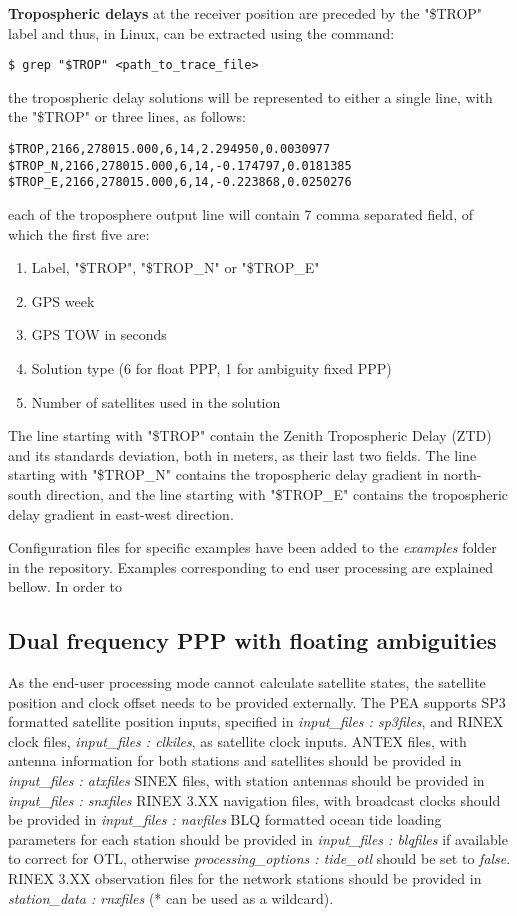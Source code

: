 \textbf{Tropospheric delays} at the receiver position are preceded by the "\$TROP" label and thus, in Linux, can be extracted using the command:
 \begin{verbatim}
$ grep "$TROP" <path_to_trace_file>
\end{verbatim}
the tropospheric delay solutions will be represented to either a single line, with the "\$TROP" or three lines, as follows:
\begin{verbatim}
$TROP,2166,278015.000,6,14,2.294950,0.0030977
$TROP_N,2166,278015.000,6,14,-0.174797,0.0181385
$TROP_E,2166,278015.000,6,14,-0.223868,0.0250276
\end{verbatim}
each of the troposphere output line will contain 7 comma separated field, of which the first five are:
\begin{enumerate}
	\item  Label, "\$TROP", "\$TROP\_N" or "\$TROP\_E"
	\item  GPS week
	\item  GPS TOW in seconds
	\item  Solution type (6 for float PPP, 1 for ambiguity fixed PPP)
	\item  Number of satellites used in the solution
\end{enumerate}
The line starting with "\$TROP" contain the Zenith Tropospheric Delay (ZTD) and its standards deviation, both in meters, as their last two fields.  The line starting with "\$TROP\_N" contains the tropospheric delay gradient in north-south direction, and  the line starting with "\$TROP\_E" contains the tropospheric delay gradient in east-west direction.

Configuration files for specific examples have been added to the \textit{examples} folder in the repository. Examples corresponding to end user processing are explained bellow. In order to 

\subsection{Dual frequency PPP with floating ambiguities}
As the end-user processing mode cannot calculate satellite states, the satellite position and clock offset needs to be provided externally.
The PEA supports SP3 formatted satellite position inputs, specified in \textit{input\_files : sp3files}, and RINEX clock files, \textit{input\_files : clkiles}, as satellite clock inputs. 
ANTEX files, with antenna information for both stations and satellites should be provided in  \textit{input\_files : atxfiles} 
SINEX files, with station antennas should be provided in  \textit{input\_files : snxfiles}
RINEX 3.XX navigation files, with broadcast clocks should be provided in  \textit{input\_files : navfiles}
BLQ formatted ocean tide  loading parameters for each station should be provided in \textit{input\_files : blqfiles} if available to correct for OTL, otherwise \textit{processing\_options : tide\_otl} should be set to \textit{false}.
RINEX 3.XX observation files for the network stations should be provided in \textit{station\_data : rnxfiles} (* can be used as a wildcard).\\


